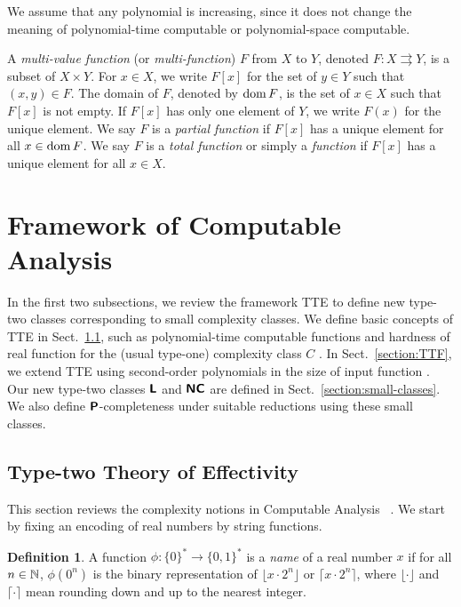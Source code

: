 \documentclass{article}
\theoremstyle{definition}
\newtheorem{definition}[theorem]{Definition}
\theoremstyle{remark}
\begin{document}
We assume that any polynomial is increasing,
since it does not change the meaning of 
polynomial-time computable or polynomial-space computable.

A {\em multi-value function} (or {\em multi-function}) $F$ from $X$ to $Y$,
denoted $F \colon X \rightrightarrows Y$,
is a subset of $X \times Y$.
For $x \in X$, we write $F[x]$ for the set of $y \in Y$ such that $(x,y) \in F$.
The domain of $F$, denoted by $\mathop{\rm dom} F$, is the set of $x \in X$ such that 
$F[x]$ is not empty.
If $F[x]$ has only one element of $Y$, we write $F(x)$ for the unique element.
We say $F$ is a {\em partial function} if $F[x]$ has a unique element for all
$x \in \mathop{\rm dom} F$.
We say $F$ is a {\em total function} or simply a {\em function} 
if $F[x]$ has a unique element for all $x \in X$.

\section{Framework of Computable Analysis}
\label{section: computable analysis}
In the first two subsections,
we review the framework TTE
to define new type-two classes corresponding to small complexity classes.
We define basic concepts of TTE in Sect.~\ref{section:TTE},
such as polynomial-time computable functions and hardness of real function
for the (usual type-one) complexity class $C$ \cite{ko1991complexity}.
In Sect.~\ref{section:TTF}, we extend TTE using second-order polynomials
in the size of input function \cite{kawamura2012complexity}.
Our new type-two classes $\text{\bfseries \sffamily \upshape L}$ and $\text{\bfseries \sffamily \upshape NC}$ are defined in Sect.~\ref{section:small-classes}.
We also define $\text{\bfseries \sffamily \upshape P}$-completeness under suitable reductions using these small classes.

\subsection{Type-two Theory of Effectivity}
\label{section:TTE}

This section reviews the complexity notions 
in Computable Analysis~%
\cite{ko1991complexity,weihrauch00:_comput_analy}. 
We start by fixing an encoding of real numbers 
by string functions.

\begin{definition}
 A function $\phi \colon \{0\} ^* \to \{0, 1\}^*$ is a \emph{name} of a real number $x$ 
 if for all $n \in \mathbb N$,
  $\phi(0^n)$ is the binary representation of $\lfloor x \cdot 2^n \rfloor$ or
  $\lceil x \cdot 2^n \rceil$,
 where $\lfloor \cdot \rfloor$ and $\lceil \cdot \rceil$ mean
 rounding down and up to the nearest integer.
\end{definition}
\end{document}

